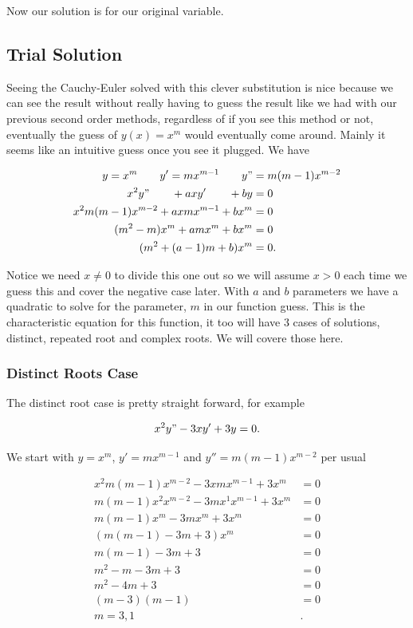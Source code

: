 \documentclass[12pt]{article}
\begin{document}
Now our solution is for our original variable.

\subsection{Trial Solution}

Seeing the Cauchy-Euler solved with this clever substitution is nice because we can see the result without really having to guess the result like we had with our previous second order methods, regardless of if you see this method or not, eventually the guess of $y(x)=x^m$ would eventually come around. Mainly it seems like an intuitive guess once you see it plugged. We have

\begin{align*}
    y=x^m \qquad y'=mx^{m-1} \qquad y"&=m(m-1)x^{m-2} \\
    x^2y"\qquad +axy'\qquad +by&=0 \\
    x^2m(m-1)x^{m-2}+axmx^{m-1}+bx^m&=0 \\
    (m^2-m)x^m+amx^m+bx^m&=0 \\
    (m^2+(a-1)m+b)x^m&=0.
\end{align*}

Notice we need $x\neq 0$ to divide this one out so we will assume $x>0$ each time we guess this and cover the negative case later. With $a$ and $b$ parameters we have a quadratic to solve for the parameter, $m$ in our function guess. This is the characteristic equation for this function, it too will have 3 cases of solutions, distinct, repeated root and complex roots. We will covere those here.


\subsubsection{Distinct Roots Case}

The distinct root case is pretty straight forward, for example

\begin{equation*}
    x^2y"-3xy'+3y=0.
\end{equation*}

We start with $y=x^m$, $y'=mx^{m-1}$ and $y''=m(m-1)x^{m-2}$ per usual

\begin{align*}
    x^2m(m-1)x^{m-2}-3xmx^{m-1}+3x^m &= 0 \\
    m(m-1)x^2x^{m-2}-3mx^1x^{m-1}+3x^m &= 0 \\
    m(m-1)x^m-3mx^m+3x^m &= 0 \\
    (m(m-1)-3m+3)x^m &= 0 \\
    m(m-1)-3m+3 &= 0 \\
    m^2-m-3m+3 &= 0 \\
    m^2-4m+3 &= 0 \\
    (m-3)(m-1) &= 0 \\
    m = 3, 1&.
\end{align*}
\end{document}
